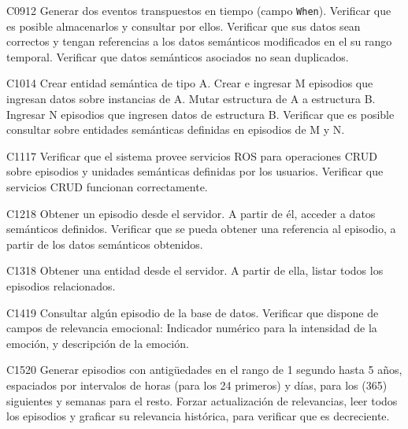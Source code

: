 \begin{def-validacion}{C}{09}{12}
	Generar dos eventos transpuestos en tiempo (campo \texttt{When}). Verificar que es posible almacenarlos y consultar por ellos. Verificar que sus datos sean correctos y tengan referencias a los datos semánticos modificados en el su rango temporal. Verificar que datos semánticos asociados no sean duplicados.
\end{def-validacion}

\begin{def-validacion}{C}{10}{14}
	Crear entidad semántica de tipo A. Crear e ingresar M episodios que ingresan datos sobre  instancias de A. Mutar estructura de A a estructura B. Ingresar N episodios que ingresen datos de estructura B. Verificar que es posible consultar sobre entidades semánticas definidas en episodios de M y N.
\end{def-validacion}


\begin{def-validacion}{C}{11}{17}
	Verificar que el sistema provee servicios ROS para operaciones CRUD sobre episodios y unidades semánticas definidas por los usuarios. Verificar que servicios CRUD funcionan correctamente.
\end{def-validacion}

\begin{def-validacion}{C}{12}{18}
	Obtener un episodio desde el servidor. A partir de él, acceder a datos semánticos definidos. Verificar que se pueda obtener una referencia al episodio, a partir de los datos semánticos obtenidos.	
\end{def-validacion}

\begin{def-validacion}{C}{13}{18}
	Obtener una entidad desde el servidor. A partir de ella, listar todos los episodios relacionados.	
\end{def-validacion}

\begin{def-validacion}{C}{14}{19}
	Consultar algún episodio de la base de datos. Verificar que dispone de campos de relevancia emocional: Indicador numérico para la intensidad de la emoción, y descripción de la emoción.	
\end{def-validacion}

\begin{def-validacion}{C}{15}{20}
Generar episodios con antigüedades en el rango de 1 segundo hasta 5 años, espaciados por intervalos de horas (para los 24 primeros) y días, para los (365) siguientes y semanas para el resto. Forzar actualización de relevancias, leer todos los episodios y graficar su relevancia histórica, para verificar que es decreciente.	
\end{def-validacion}

